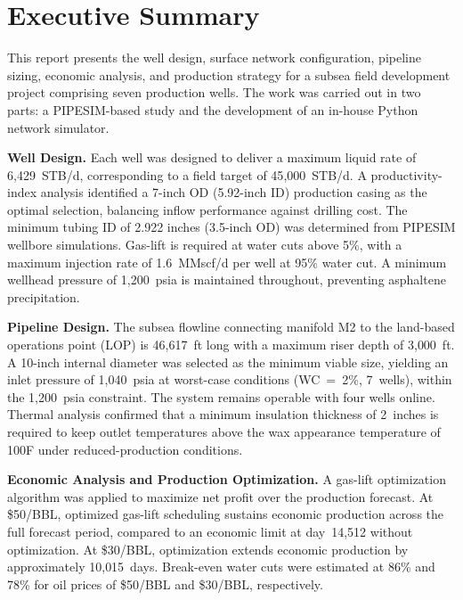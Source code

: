 

\chapter*{Executive Summary}

This report presents the well design, surface network configuration, pipeline sizing, economic analysis, and production strategy for a subsea field development project comprising seven production wells. The work was carried out in two parts: a PIPESIM-based study and the development of an in-house Python network simulator.

\textbf{Well Design.} Each well was designed to deliver a maximum liquid rate of 6{,}429~STB/d, corresponding to a field target of 45{,}000~STB/d. A productivity-index analysis identified a 7-inch OD (5.92-inch ID) production casing as the optimal selection, balancing inflow performance against drilling cost. The minimum tubing ID of 2.922 inches (3.5-inch OD) was determined from PIPESIM wellbore simulations. Gas-lift is required at water cuts above 5\%, with a maximum injection rate of 1.6~MMscf/d per well at 95\% water cut. A minimum wellhead pressure of 1{,}200~psia is maintained throughout, preventing asphaltene precipitation.

\textbf{Pipeline Design.} The subsea flowline connecting manifold M2 to the land-based operations point (LOP) is 46{,}617~ft long with a maximum riser depth of 3{,}000~ft. A 10-inch internal diameter was selected as the minimum viable size, yielding an inlet pressure of 1{,}040~psia at worst-case conditions (WC~=~2\%, 7~wells), within the 1{,}200~psia constraint. The system remains operable with four wells online. Thermal analysis confirmed that a minimum insulation thickness of 2~inches is required to keep outlet temperatures above the wax appearance temperature of 100\textdegree F under reduced-production conditions.

\textbf{Economic Analysis and Production Optimization.} A gas-lift optimization algorithm was applied to maximize net profit over the production forecast. At \$50/BBL, optimized gas-lift scheduling sustains economic production across the full forecast period, compared to an economic limit at day~14{,}512 without optimization. At \$30/BBL, optimization extends economic production by approximately 10{,}015~days. Break-even water cuts were estimated at 86\% and 78\% for oil prices of \$50/BBL and \$30/BBL, respectively.

